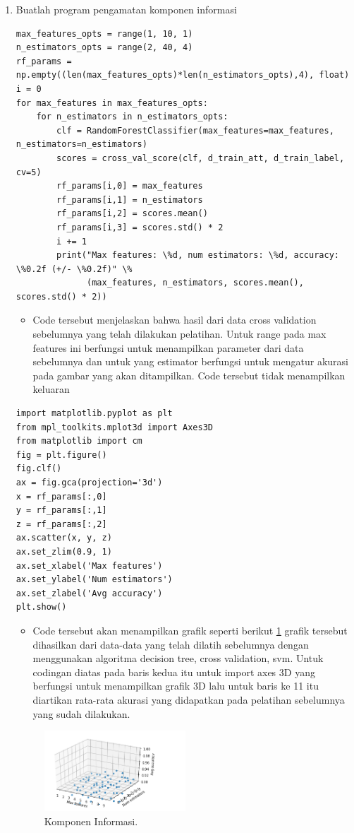 \begin{enumerate}
\item Buatlah program pengamatan komponen informasi\par
\begin{verbatim}
max_features_opts = range(1, 10, 1)
n_estimators_opts = range(2, 40, 4)
rf_params = np.empty((len(max_features_opts)*len(n_estimators_opts),4), float)
i = 0
for max_features in max_features_opts:
    for n_estimators in n_estimators_opts:
        clf = RandomForestClassifier(max_features=max_features, n_estimators=n_estimators)
        scores = cross_val_score(clf, d_train_att, d_train_label, cv=5)
        rf_params[i,0] = max_features
        rf_params[i,1] = n_estimators
        rf_params[i,2] = scores.mean()
        rf_params[i,3] = scores.std() * 2
        i += 1
        print("Max features: \%d, num estimators: \%d, accuracy: \%0.2f (+/- \%0.2f)" \%               
              (max_features, n_estimators, scores.mean(), scores.std() * 2))
\end{verbatim}
\begin{itemize}
\item Code tersebut menjelaskan bahwa hasil dari data cross validation sebelumnya yang telah dilakukan pelatihan. Untuk range pada max features ini berfungsi untuk menampilkan parameter dari data sebelumnya dan untuk yang estimator berfungsi untuk mengatur akurasi pada gambar yang akan ditampilkan. Code tersebut tidak menampilkan keluaran
\end{itemize}

\begin{verbatim}
import matplotlib.pyplot as plt
from mpl_toolkits.mplot3d import Axes3D
from matplotlib import cm
fig = plt.figure()
fig.clf()
ax = fig.gca(projection='3d')
x = rf_params[:,0]
y = rf_params[:,1]
z = rf_params[:,2]
ax.scatter(x, y, z)
ax.set_zlim(0.9, 1)
ax.set_xlabel('Max features')
ax.set_ylabel('Num estimators')
ax.set_zlabel('Avg accuracy')
plt.show()
\end{verbatim}
\begin{itemize}
\item Code tersebut akan menampilkan grafik seperti berikut \ref{yt16} grafik tersebut dihasilkan dari data-data yang telah dilatih sebelumnya dengan menggunakan algoritma decision tree, cross validation, svm. Untuk codingan diatas pada baris kedua itu untuk import axes 3D yang berfungsi untuk menampilkan grafik 3D lalu untuk baris ke 11 itu diartikan rata-rata akurasi yang didapatkan pada pelatihan sebelumnya yang sudah dilakukan.
\end{itemize}
		\begin{figure}[ht]
		\centerline{\includegraphics[width=0.5\textwidth]{figures/im/yt16.png}}
		\caption{Komponen Informasi.}
		\label{yt16}
		\end{figure}
\end{enumerate}

